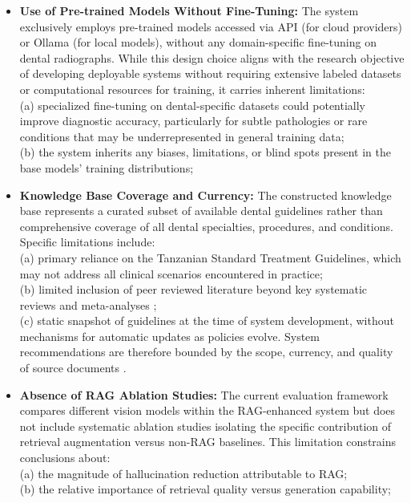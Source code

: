 \documentclass[12pt,a4paper]{report}
\begin{document}
\begin{itemize}
		\item \textbf{Use of Pre-trained Models Without Fine-Tuning:} The system exclusively employs pre-trained models accessed via API (for cloud providers) or Ollama (for local models), without any domain-specific fine-tuning on dental radiographs. While this design choice aligns with the research objective of developing deployable systems without requiring extensive labeled datasets or computational resources for training, it carries inherent limitations: \\
		(a) specialized fine-tuning on dental-specific datasets could potentially improve diagnostic accuracy, particularly for subtle pathologies or rare conditions that may be underrepresented in general training data; \\
		(b) the system inherits any biases, limitations, or blind spots present in the base models' training distributions; 
		
		\item \textbf{Knowledge Base Coverage and Currency:} The constructed knowledge base represents a curated subset of available dental guidelines rather than comprehensive coverage of all dental specialties, procedures, and conditions. Specific limitations include: \\
		(a) primary reliance on the Tanzanian Standard Treatment Guidelines, which may not address all clinical scenarios encountered in practice; \\
		(b) limited inclusion of peer reviewed literature beyond key systematic reviews and meta-analyses \cite{Dashti2024DLCariesUmbrella,Arzani2025AICariesUmbrella,MADANKUMAR20261}; \\
		(c) static snapshot of guidelines at the time of system development, without mechanisms for automatic updates as policies evolve. System recommendations are therefore bounded by the scope, currency, and quality of source documents \cite{world2024global,Edward2024OralHealthTZ,tanzania_oral_health_policy}.
		
		\item \textbf{Absence of RAG Ablation Studies:} The current evaluation framework compares different vision models within the RAG-enhanced system but does not include systematic ablation studies isolating the specific contribution of retrieval augmentation versus non-RAG baselines. This limitation constrains conclusions about: \\
		(a) the magnitude of hallucination reduction attributable to RAG; \\
		(b) the relative importance of retrieval quality versus generation capability; 
		

\end{itemize}
\end{document}
